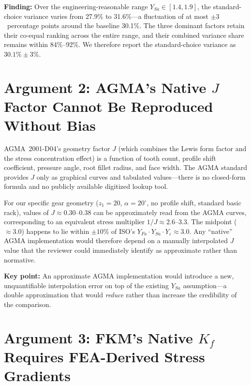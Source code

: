 \documentclass[12pt,a4paper]{article}
\begin{document}
\noindent\textbf{Finding:} Over the engineering-reasonable range
$Y_{Sa} \in [1.4, 1.9]$, the standard-choice variance varies from
27.9\% to 31.6\%---a fluctuation of at most $\pm 3$~percentage points
around the baseline 30.1\%. The three dominant factors retain their
co-equal ranking across the entire range, and their combined variance
share remains within 84\%--92\%. We therefore report the
standard-choice variance as $30.1\% \pm 3\%$.

\section*{Argument 2: AGMA's Native $J$ Factor Cannot Be Reproduced Without Bias}

AGMA~2001-D04's geometry factor $J$ (which combines the Lewis form
factor and the stress concentration effect) is a function of tooth
count, profile shift coefficient, pressure angle, root fillet radius,
and face width. The AGMA standard provides $J$ only as graphical
curves and tabulated values---there is no closed-form formula and no
publicly available digitized lookup tool.

For our specific gear geometry ($z_1=20$, $\alpha=20^\circ$, no profile
shift, standard basic rack), values of $J \approx 0.30$--$0.38$ can be
approximately read from the AGMA curves, corresponding to an equivalent
stress multiplier $1/J \approx 2.6$--$3.3$. The midpoint ($\approx 3.0$)
happens to lie within $\pm 10$\% of ISO's $Y_{Fa} \cdot Y_{Sa} \cdot
Y_\varepsilon \approx 3.0$. Any ``native'' AGMA implementation would
therefore depend on a manually interpolated $J$ value that the reviewer
could immediately identify as approximate rather than normative.

\textbf{Key point:} An approximate AGMA implementation would introduce
a new, unquantifiable interpolation error on top of the existing
$Y_{Sa}$ assumption---a double approximation that would \emph{reduce}
rather than increase the credibility of the comparison.

\section*{Argument 3: FKM's Native $K_f$ Requires FEA-Derived Stress Gradients}
\end{document}

